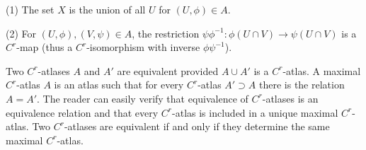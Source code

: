 (1) The set $X$ is the union of all $U$ for $(U, \phi) \in A$.

(2) For $(U, \phi), (V, \psi) \in A$, the restriction $\psi \phi^{-1} : \phi(U \cap V) \rightarrow \psi(U \cap V)$ is a $C^r$-map (thus a $C^r$-isomorphism with inverse $\phi \psi^{-1}$).

Two $C^r$-atlases $A$ and $A'$ are equivalent provided $A \cup A'$ is a $C^r$-atlas. A maximal $C^r$-atlas $A$ is an atlas such that for every $C^r$-atlas $A' \supset A$ there is the relation $A = A'$. The reader can easily verify that equivalence of $C^r$-atlases is an equivalence relation and that every $C^r$-atlas is included in a unique maximal $C^r$-atlas. Two $C^r$-atlases are equivalent if and only if they determine the same maximal $C^r$-atlas.
